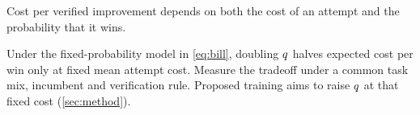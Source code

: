 \begin{keyidea}
  Cost per verified improvement depends on both the cost of an attempt
  and the probability that it wins.
\end{keyidea}

Under the fixed-probability model in \cref{eq:bill}, doubling $q$ halves
expected cost per win only at fixed mean attempt cost. Measure the
tradeoff under a common task mix, incumbent and verification rule.
Proposed training aims to raise $q$ at that fixed cost
(\cref{sec:method}).
